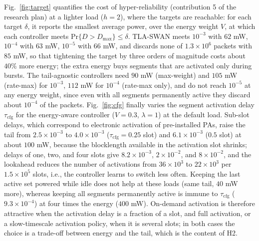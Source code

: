 \documentclass[journal]{IEEEtran}
\renewcommand{\Pr}{\mathrm{Pr}}
\newcommand{\Dmax}{D_{\max}}
\begin{document}
Fig.~\ref{fig:target} quantifies the cost of hyper-reliability (contribution 5 of the research plan) at a lighter load ($h=2$), where the targets are reachable: for each target $\delta$, it reports the smallest average power, over the energy weight $V$, at which each controller meets $\Pr\{D>\Dmax\}\le\delta$. TLA-SWAN meets $10^{-3}$ with $62$ mW, $10^{-4}$ with $63$ mW, $10^{-5}$ with $66$ mW, and discards none of $1.3\times10^{6}$ packets with $85$ mW, so that tightening the target by three orders of magnitude costs about $40\%$ more energy; the extra energy buys segments that are activated only during bursts. The tail-agnostic controllers need $90$ mW (max-weight) and $105$ mW (rate-max) for $10^{-3}$, $112$ mW for $10^{-4}$ (rate-max only), and do not reach $10^{-5}$ at any energy weight, since even with all segments permanently active they discard about $10^{-4}$ of the packets. Fig.~\ref{fig:cfg} finally varies the segment activation delay $\tau_{\mathrm{cfg}}$ for the energy-aware controller ($V=0.3$, $\lambda=1$) at the default load. Sub-slot delays, which correspond to electronic activation of pre-installed PAs, raise the tail from $2.5\times10^{-3}$ to $4.0\times10^{-3}$ ($\tau_{\mathrm{cfg}}=0.25$ slot) and $6.1\times10^{-3}$ ($0.5$ slot) at about $100$ mW, because the blocklength available in the activation slot shrinks; delays of one, two, and four slots give $8.2\times10^{-3}$, $2\times10^{-2}$, and $8\times10^{-2}$, and the lookahead reduces the number of activations from $36\times10^{3}$ to $22\times10^{3}$ per $1.5\times10^{5}$ slots, i.e., the controller learns to switch less often. Keeping the last active set powered while idle does not help at these loads (same tail, $40$ mW more), whereas keeping all segments permanently active is immune to $\tau_{\mathrm{cfg}}$ ($9.3\times10^{-4}$) at four times the energy ($400$ mW). On-demand activation is therefore attractive when the activation delay is a fraction of a slot, and full activation, or a slow-timescale activation policy, when it is several slots; in both cases the choice is a trade-off between energy and the tail, which is the content of H2.
\end{document}
